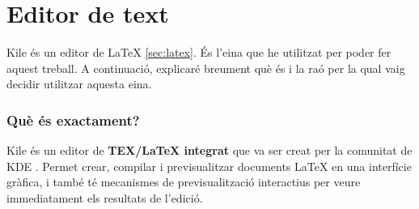 \section{Editor de text} \label{sec:Kile}

%
%
Kile \cite{kile} és un editor de LaTeX \ref{sec:latex}. És l’eina que he utilitzat per poder fer aquest treball. A continuació, explicaré breument què és i la raó per la qual vaig decidir utilitzar aquesta eina.


\subsubsection{Què és exactament?}
Kile és un editor de \textbf{TEX/LaTeX integrat} que va ser creat per la comunitat de KDE \cite{kile}. Permet crear, compilar i previsualitzar documents LaTeX en una interfície gràfica, i també té mecanismes de previsualització interactius per veure immediatament els resultats de l’edició.

